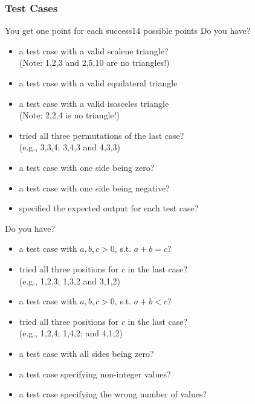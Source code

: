 \subsubsection*{Test Cases}

\begin{Frame}[allowframebreaks]{You get one point for each success}{14 possible points}
  Do you have?
  \begin{itemize}
    \item a test case with a valid scalene triangle?\\
      (Note: 1,2,3 and 2,5,10 are no triangles!)
    \item a test case with a valid equilateral triangle
    \item a test case with a valid isosceles triangle\\
      (Note: 2,2,4 is no triangle!)
    \item tried all three permutations of the last case?\\
    (e.g., 3,3,4; 3,4,3 and 4,3,3)
    \item a test case with one side being zero?
    \item a test case with one side being negative?
    \item specified the expected output for each test case?
  \end{itemize}

  \framebreak

  Do you have?
  \begin{itemize}
    \item a test case with $a,b,c > 0$, s.t. $a+b=c$?
    \item tried all three positions for $c$ in the last case?\\
    (e.g., 1,2,3; 1,3,2 and 3,1,2)
    \item a test case with $a,b,c > 0$, s.t. $a+b<c$?
    \item tried all three positions for $c$ in the last case?\\
    (e.g., 1,2,4; 1,4,2; and 4,1,2)
    \item a test case with all sides being zero?
    \item a test case specifying non-integer values?
    \item a test case specifying the wrong number of values?
  \end{itemize}
\end{Frame}
